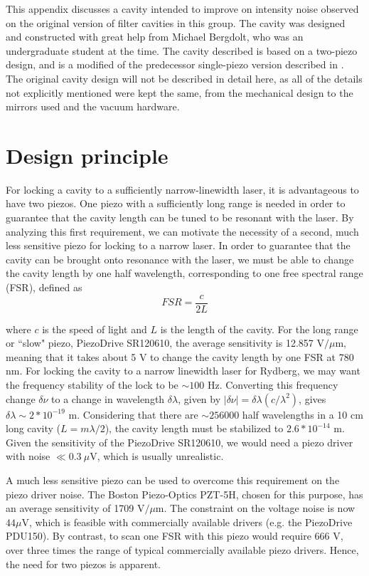 This appendix discusses a cavity intended to improve on intensity noise observed on the original version of filter cavities in this group\cite{Young2022}. The cavity was designed and constructed with great help from Michael Bergdolt, who was an undergraduate student at the time. The cavity described is based on a two-piezo design, and is a modified of the predecessor single-piezo version described in \cite{kwon2019rydberg}. The original cavity design will not be described in detail here, as all of the details not explicitly mentioned were kept the same, from the mechanical design to the mirrors used and the vacuum hardware.

\section{Design principle}

For locking a cavity to a sufficiently narrow-linewidth laser, it is  advantageous to have two piezos\cite{Braverman2018}. One piezo with a sufficiently long range is needed in order to guarantee that the cavity length can be tuned to be resonant with the laser. By analyzing this first requirement, we can motivate the necessity of a second, much less sensitive piezo for locking to a narrow laser. In order to guarantee that the cavity can be brought onto resonance with the laser, we must be able to change the cavity length by one half wavelength, corresponding to one free spectral range (FSR), defined as
\begin{equation}
    FSR = \frac{c}{2L}
\end{equation}

where $c$ is the speed of light and $L$ is the length of the cavity. For the long range or ``slow" piezo, PiezoDrive SR120610, the average sensitivity is 12.857 V$/ \mu$m, meaning that it takes about 5 V to change the cavity length by one FSR at 780 nm. 
For locking the cavity to a narrow linewidth laser for Rydberg, we may want the frequency stability of the lock to be $\sim 100$ Hz. Converting this frequency change $\delta \nu$ to a change in wavelength $\delta \lambda$, given by $|\delta \nu| = \delta\lambda(c/\lambda^2)$, gives $\delta \lambda \sim 2*10^{-19}$ m. Considering that there are $\sim 256000$ half wavelengths in a 10 cm long cavity ($L=m \lambda/2$), the cavity length must be stabilized to $2.6*10^{-14}$ m. Given the sensitivity of the PiezoDrive SR120610, we would need a piezo driver with noise $\ll 0.3~\mu$V, which is usually unrealistic.

A much less sensitive piezo can be used to overcome this requirement on the piezo driver noise. The Boston Piezo-Optics PZT-5H, chosen for this purpose, has an average sensitivity of 1709 V$/\mu$m. The constraint on the voltage noise is now $44 \mu$V, which is feasible with commercially available drivers (e.g. the PiezoDrive PDU150). By contrast, to scan one FSR with this piezo would require 666 V, over three times the range of typical commercially available piezo drivers. Hence, the need for two piezos is apparent. 

